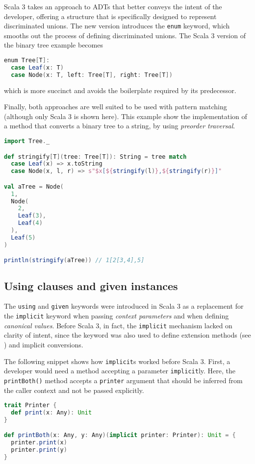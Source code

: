 Scala 3 takes an approach to ADTs that better conveys the intent of the developer, offering a structure that is specifically designed to represent discriminated unions.
%
The new version introduces the \texttt{enum} keyword, which smooths out the process of defining discriminated unions.
%
The Scala 3 version of the binary tree example becomes
%
\begin{lstlisting}[frame=single, language=scala]
enum Tree[T]:
  case Leaf(x: T)
  case Node(x: T, left: Tree[T], right: Tree[T])
\end{lstlisting}
%
which is more succinct and avoids the boilerplate required by its predecessor.

Finally, both approaches are well suited to be used with pattern matching (although only Scala 3 is shown here).
%
This example show the implementation of a method that converts a binary tree to a string, by using \textit{preorder traversal}.
%
\begin{lstlisting}[frame=single, language=scala]
import Tree._

def stringify[T](tree: Tree[T]): String = tree match
  case Leaf(x) => x.toString
  case Node(x, l, r) => s"$x[${stringify(l)},${stringify(r)}]"

val aTree = Node(
  1,
  Node(
    2,
    Leaf(3),
    Leaf(4)
  ),
  Leaf(5)
)

println(stringify(aTree)) // 1[2[3,4],5]
\end{lstlisting}

\subsection{Using clauses and given instances}
\label{sec:given-using}

The \texttt{using} and \texttt{given} keywords were introduced in Scala 3 as a replacement for the \texttt{implicit} keyword when passing \textit{context parameters} and when defining \textit{canonical values}.
%
Before Scala 3, in fact, the \texttt{implicit} mechanism lacked on clarity of intent, since the keyword was also used to define extension methods (see ) and implicit conversions.

The following snippet shows how \texttt{implicit}s worked before Scala 3.
%
First, a developer would need a method accepting a parameter \texttt{implicit}ly.
%
Here, the \texttt{printBoth()} method accepts a \texttt{printer} argument that should be inferred from the caller context and not be passed explicitly.
%
\begin{lstlisting}[frame=single, language=scala]
trait Printer {
  def print(x: Any): Unit
}

def printBoth(x: Any, y: Any)(implicit printer: Printer): Unit = {
  printer.print(x)
  printer.print(y)
}
\end{lstlisting}

